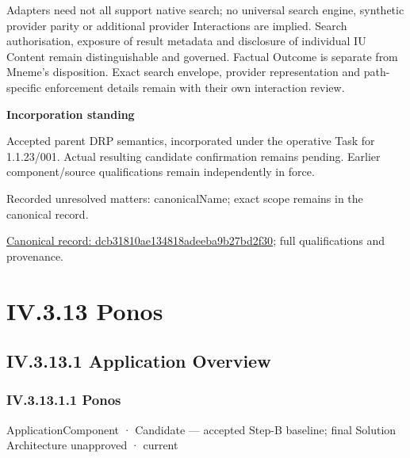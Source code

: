 Adapters need not all support native search; no universal search engine, synthetic provider parity or additional provider Interactions are implied. Search authorisation, exposure of result metadata and disclosure of individual IU Content remain distinguishable and governed. Factual Outcome is separate from Mneme's disposition. Exact search envelope, provider representation and path-specific enforcement details remain with their own interaction review.



\par\medskip\textbf{Incorporation standing}\par


Accepted parent DRP semantics, incorporated under the operative Task for 1.1.23/001. Actual resulting candidate confirmation remains pending. Earlier component/source qualifications remain independently in force.


{\small Recorded unresolved matters: canonicalName; exact scope remains in the canonical record.}\par
{\footnotesize \href{../../../../continuum/application/application-service/dcb31810ae134818adeeba9b27bd2f30.md}{Canonical record: dcb31810ae134818adeeba9b27bd2f30}; full qualifications and provenance.}\par
\section*{IV.3.13 Ponos}
\label{navigation:IV.3.13}

\subsection*{IV.3.13.1 Application Overview}
\label{navigation:IV.3.13.1}

\subsubsection*{IV.3.13.1.1 Ponos}
\label{navigation:IV.3.13.1.1}

\label{element:b521762c1ea444b48cd5f66be3752d30}
{\small ApplicationComponent · Candidate — accepted Step-B baseline; final Solution Architecture unapproved · current}\par

